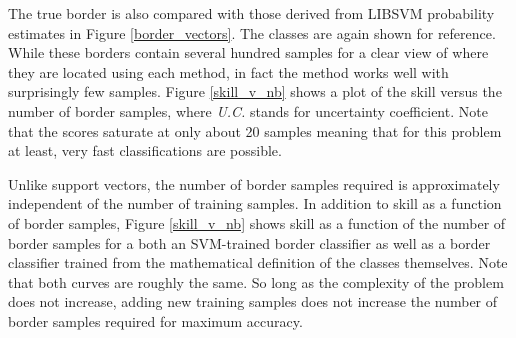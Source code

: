 The true border is also compared with those derived from LIBSVM
probability estimates in Figure \ref{border_vectors}.
The classes are again shown for reference.
While these borders contain several hundred samples for a clear view of where
they are located using each method, in fact the method works well with
surprisingly few samples.  Figure \ref{skill_v_nb} shows a plot of the skill
versus the number of border samples, where {\it U.C.} stands for
uncertainty coefficient. Note that the scores saturate at only about 20
samples meaning that for this problem at least, very fast classifications are
possible.

Unlike support vectors, the number of border samples required is approximately
independent of the number of training samples.
In addition to skill as a function of border samples,
Figure \ref{skill_v_nb} shows skill as a function of the number of border 
samples for a both an SVM-trained border classifier as well as
a border classifier trained from the mathematical definition of the 
classes themselves.
Note that both curves are roughly the same.
So long as the complexity of
the problem does not increase, adding new training samples does not increase
the number of border samples required for maximum accuracy.

